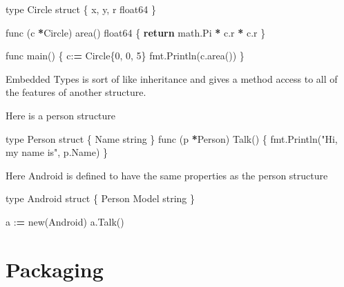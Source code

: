 \documentclass[]{book}
\newenvironment{Shaded}{\begin{snugshade}}{\end{snugshade}}
\newcommand{\BuiltInTok}[1]{#1}
\newcommand{\ControlFlowTok}[1]{\textcolor[rgb]{0.13,0.29,0.53}{\textbf{#1}}}
\newcommand{\DecValTok}[1]{\textcolor[rgb]{0.00,0.00,0.81}{#1}}
\newcommand{\NormalTok}[1]{#1}
\newcommand{\OperatorTok}[1]{\textcolor[rgb]{0.81,0.36,0.00}{\textbf{#1}}}
\newcommand{\StringTok}[1]{\textcolor[rgb]{0.31,0.60,0.02}{#1}}
\begin{document}
\begin{Shaded}
\begin{Highlighting}[]
\BuiltInTok{type}\NormalTok{ Circle struct \{             }
\NormalTok{    x, y, r float64              }
\NormalTok{\}                                }
                                 
\NormalTok{func (c }\OperatorTok{*}\NormalTok{Circle) area() float64 \{}
    \ControlFlowTok{return}\NormalTok{ math.Pi }\OperatorTok{*}\NormalTok{ c.r }\OperatorTok{*}\NormalTok{ c.r   }
\NormalTok{\}                                }
                                 
\NormalTok{func main() \{                    }
\NormalTok{    c:}\OperatorTok{=}\NormalTok{ Circle\{}\DecValTok{0}\NormalTok{, }\DecValTok{0}\NormalTok{, }\DecValTok{5}\NormalTok{\}          }
\NormalTok{    fmt.Println(c.area())        }
\NormalTok{\}   }
\end{Highlighting}
\end{Shaded}

Embedded Types is sort of like inheritance and gives a method access to all of the features of another structure.

Here is a person structure

\begin{Shaded}
\begin{Highlighting}[]
\BuiltInTok{type}\NormalTok{ Person struct \{}
\NormalTok{  Name string}
\NormalTok{\}}
\NormalTok{func (p }\OperatorTok{*}\NormalTok{Person) Talk() \{}
\NormalTok{  fmt.Println(}\StringTok{"Hi, my name is"}\NormalTok{, p.Name)}
\NormalTok{\}}
\end{Highlighting}
\end{Shaded}

Here Android is defined to have the same properties as the person structure

\begin{Shaded}
\begin{Highlighting}[]
\BuiltInTok{type}\NormalTok{ Android struct \{}
\NormalTok{  Person}
\NormalTok{  Model string}
\NormalTok{\}}

\NormalTok{a :}\OperatorTok{=}\NormalTok{ new(Android)}
\NormalTok{a.Talk()}
\end{Highlighting}
\end{Shaded}

\hypertarget{packaging}{%
\section{Packaging}\label{packaging}}
\end{document}
